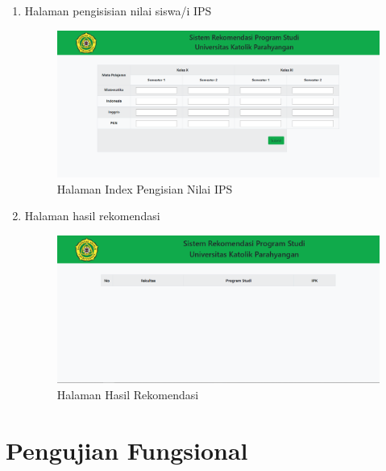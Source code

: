 \begin{enumerate}
    \item Halaman pengisisian nilai siswa/i IPS
    
    \begin{figure}[H]
        \centering
        \includegraphics[width = 12cm, height =8 cm]{doc/DokumenSkripsi/Gambar/gambar53.png}
        \caption{Halaman Index Pengisian Nilai IPS}
        \label{fig:gambar53}
    \end{figure}
    
    \item Halaman hasil rekomendasi
    \begin{figure}[H]
        \centering
        \includegraphics[width = 12cm, height =8 cm]{doc/DokumenSkripsi/Gambar/gambar54.png}
        \caption{Halaman Hasil Rekomendasi}
        \label{fig:gambar54}
    \end{figure}
\end{enumerate}

\section{Pengujian Fungsional}
\label{sec:pengujian fungsional}


